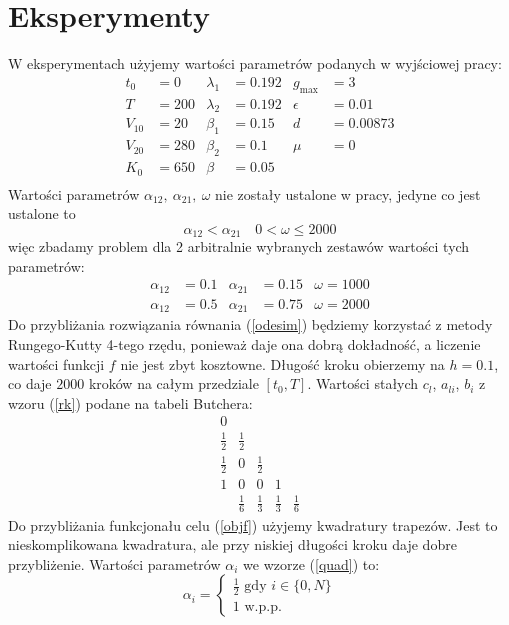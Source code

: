 \documentclass[11pt]{article}
\begin{document}
\section{Eksperymenty}
W eksperymentach użyjemy wartości parametrów podanych w wyjściowej pracy:
\begin{align*}
  t_0 &= 0          & \lambda_1 &= 0.192 & g_{\max} &= 3    \\
  T &= 200          & \lambda_2 &= 0.192 & \epsilon &= 0.01 \\
  V_{10} &= 20      & \beta_1 &= 0.15    & d &= 0.00873     \\
  V_{20} &= 280     & \beta_2 &= 0.1     & \mu &= 0         \\
  K_0 &= 650        & \beta &= 0.05      &       &          \\
\end{align*}
Wartości parametrów $\alpha_{12},\ \alpha_{21},\ \omega$ nie zostały ustalone w pracy, jedyne co jest ustalone to
\[ \alpha_{12} < \alpha_{21}\quad 0 < \omega \le 2000 \]
więc zbadamy problem dla 2 arbitralnie wybranych zestawów wartości tych parametrów:
\begin{align}\label{exp1}
  \alpha_{12} &= 0.1 & \alpha_{21} &= 0.15 & \omega = 1000
\end{align}
\begin{align}\label{exp2}
  \alpha_{12} &= 0.5 & \alpha_{21} &= 0.75 & \omega = 2000
\end{align}
Do przybliżania rozwiązania równania (\ref{odesim}) będziemy korzystać z metody Rungego-Kutty 4-tego rzędu, ponieważ daje ona dobrą dokładność, a liczenie wartości funkcji $f$ nie jest zbyt kosztowne. Długość kroku obierzemy na $h = 0.1$, co daje $2000$ kroków na całym przedziale $[t_0, T]$. Wartości stałych $c_l$, $a_{li}$, $b_i$ z wzoru (\ref{rk}) podane na tabeli Butchera:
\begin{equation}\label{butcher}
  \begin{array}
    {c|cccc}
    0\\
    \frac{1}{2} & \frac{1}{2}\\
    \frac{1}{2} &0 &\frac{1}{2} \\
    1& 0& 0& 1\\
    \hline{}
    & \frac{1}{6} &\frac{1}{3} &\frac{1}{3} &\frac{1}{6} 
  \end{array}
\end{equation}
Do przybliżania funkcjonału celu (\ref{objf}) użyjemy kwadratury trapezów. Jest to nieskomplikowana kwadratura, ale przy niskiej długości kroku daje dobre przybliżenie. Wartości parametrów $\alpha_i$ we wzorze (\ref{quad}) to:
\begin{equation} \label{trapezoidal}
  \alpha_i = \begin{cases} \frac{1}{2} \text{ gdy } i \in \{0, N\} \\ 1 \text{ w.p.p.} \end{cases}
\end{equation}
\end{document}
